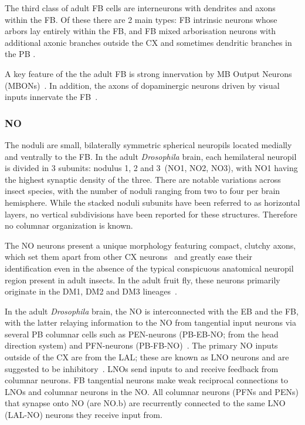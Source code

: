         The third class of adult FB cells are interneurons with dendrites and axons within the FB.
        Of these there are 2 main types: FB intrinsic neurons whose arbors lay entirely within the FB, and FB mixed arborisation neurons with additional axonic branches outside the CX and sometimes dendritic branches in the PB \citep{wolff2015neuroarchitecture}.

        A key feature of the the adult FB is strong innervation by MB Output Neurons (MBONs)~\citep{scheffer2020connectome, hulse2021connectome}. %
        In addition, the axons of dopaminergic neurons driven by visual inputs innervate the FB~\citep{lin2013comprehensive}.
        \subsubsection{NO}
        The noduli are small, bilaterally symmetric spherical neuropils located medially and ventrally to the FB. In the adult \textit{Drosophila} brain, each hemilateral neuropil is divided in 3 subunits: nodulus 1, 2 and 3~(NO1, NO2, NO3), with NO1 having the highest synaptic density of the three. There are notable variations across insect species, with the number of noduli ranging from two to four per brain hemisphere.
        While the stacked noduli subunits have been referred to as horizontal layers, no vertical subdivisions have been reported for these structures. Therefore no columnar organization is known.

        The NO neurons present a unique morphology featuring compact, clutchy axons, which set them apart from other CX neurons~\citep{wolff2018neuroarchitecture, hulse2021connectome} and greatly ease their identification even in the absence of the typical conspicuous anatomical neuropil region present in adult insects. In the adult fruit fly, these neurons primarily originate in the DM1, DM2 and DM3 lineages~\citep{andrade2019developmentally}.


        In the adult \textit{Drosophila} brain, the NO is interconnected with the EB and the FB, with the latter relaying information to the NO from tangential input neurons via several PB columnar cells such as PEN-neurons (PB-EB-NO; from the head direction system) and PFN-neurons (PB-FB-NO)~\citep{wolff2015neuroarchitecture, hulse2021connectome}.
        The primary NO inputs outside of the CX are from the LAL; these are known as LNO neurons and are suggested to be inhibitory~\citep{wolff2018neuroarchitecture, hulse2021connectome}.
        LNOs send inputs to and receive feedback from columnar neurons. %
        FB tangential neurons make weak reciprocal connections to LNOs and columnar neurons in the NO.
        All columnar neurons (PFNs and PENs) that synapse onto NO (are NO.b) are recurrently connected to the same LNO (LAL-NO) neurons they receive input from. 

